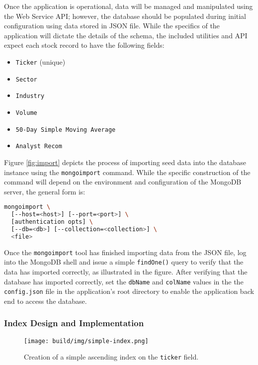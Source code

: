 \documentclass[
11pt,
titlepage,
]{article}
\providecommand{\tightlist}{%
  \setlength{\itemsep}{0pt}\setlength{\parskip}{0pt}\setstretch{1.25}}
\begin{document}
Once the application is operational, data will be managed and manipulated using
the Web Service API; however, the database should be populated during initial
configuration using data stored in JSON file. While the specifics of the
application will dictate the details of the schema, the included utilities and
API expect each stock record to have the following fields:

\begin{itemize}
    \tightlist
  \item \texttt{Ticker} (unique)
  \item \texttt{Sector}
  \item \texttt{Industry}
  \item \texttt{Volume}
  \item \texttt{50-Day\ Simple\ Moving\ Average}
  \item \texttt{Analyst\ Recom}
\end{itemize}

Figure \ref{fig:import} depicts the process of importing seed data into the database
instance using the \texttt{mongoimport} command. While the specific construction
of the command will depend on the environment and configuration of the MongoDB
server, the general form is:

\begin{lstlisting}[language=bash]
  mongoimport \
  [--host=<host>] [--port=<port>] \
  [authentication opts] \
  [--db=<db>] [--collection=<collection>] \
  <file>
\end{lstlisting}

\noindent Once the \texttt{mongoimport} tool has finished importing data from
the JSON file, log into the MongoDB shell and issue a simple \texttt{findOne()}
query to verify that the data has imported correctly, as illustrated in the
figure. After verifying that the database has imported correctly, set the
\texttt{dbName} and \texttt{colName} values in the the \texttt{config.json} file
in the application's root directory to enable the application back end to access
the database.

\subsubsection{Index Design and Implementation}

\begin{figure}[tp]
  \texttt{[image: build/img/simple-index.png]}
  \caption{Creation of a simple ascending index on the \texttt{ticker} field.}
  \label{fig:simple-index}
\end{figure}
\end{document}

